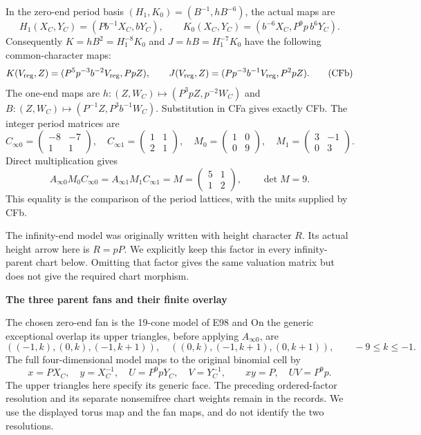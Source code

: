 In the zero-end period basis \((H_1,K_0)=(B^{-1},hB^{-6})\), the actual maps are
\[
 H_1(X_C,Y_C)=(Pb^{-1}X_C,bY_C),\qquad
 K_0(X_C,Y_C)=(b^{-6}X_C,P^9p\,b^6Y_C).
\]
Consequently \(K=hB^2=H_1^{-8}K_0\) and
\(J=hB=H_1^{-7}K_0\) have the following common-character maps:
\[
 K(V_{\rm reg},Z)=(P^5p^{-3}b^{-2}V_{\rm reg},PpZ),\qquad
 J(V_{\rm reg},Z)=(Pp^{-3}b^{-1}V_{\rm reg},P^2pZ).               \tag{CFb}
\]
The one-end maps are \(h:(Z,W_C)\mapsto(P^3pZ,p^{-2}W_C)\) and
\(B:(Z,W_C)\mapsto(P^{-1}Z,P^3b^{-1}W_C)\). Substitution in CFa gives exactly CFb. The integer period matrices are
\[
 C_{\infty0}=\begin{pmatrix}-8&-7\\1&1\end{pmatrix},\quad
 C_{\infty1}=\begin{pmatrix}1&1\\2&1\end{pmatrix},\quad
 M_0=\begin{pmatrix}1&0\\0&9\end{pmatrix},\quad
 M_1=\begin{pmatrix}3&-1\\0&3\end{pmatrix}.
\]
Direct multiplication gives
\[
 A_{\infty0}M_0C_{\infty0}
 =A_{\infty1}M_1C_{\infty1}
 =M=\begin{pmatrix}5&1\\1&2\end{pmatrix},\qquad \det M=9.          \tag{CFc}
\]
This equality is the comparison of the period lattices, with the units supplied by CFb.

The infinity-end model was originally written with height character \(R\).
Its actual height arrow here is \(R=pP\). We explicitly keep this factor in every infinity-parent chart below. Omitting that factor gives the same valuation matrix but does not give the required chart morphism.

\par

\medskip\noindent\textbf{The three parent fans and their finite overlay}

\par\nobreak

The chosen zero-end fan is the 19-cone model of E98 and
 On the generic exceptional overlap its upper triangles, before applying \(A_{\infty0}\), are
\[
 ((-1,k),(0,k),(-1,k+1)),\quad
 ((0,k),(-1,k+1),(0,k+1)),\qquad -9\le k\le-1.
\]
The full four-dimensional model maps to the original binomial cell by
\[
 x=PX_C,\quad y=X_C^{-1},\quad U=P^9pY_C,\quad V=Y_C^{-1},
 \qquad xy=P,\quad UV=P^9p.
\]
The upper triangles here specify its generic face. The preceding ordered-factor resolution and its separate nonsemifree chart weights remain in the records. We use the displayed torus map and the fan maps, and do not identify the two resolutions.

